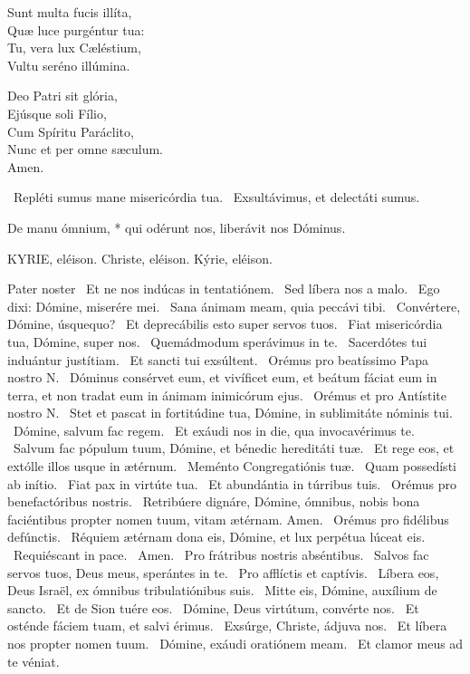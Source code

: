 Sunt multa fucis illíta,\\
Quæ luce purgéntur tua:\\
Tu, vera lux Cæléstium,\\
Vultu seréno illúmina.

Deo Patri sit glória,\\
Ejúsque soli Fílio,\\
Cum Spíritu Paráclito,\\
Nunc et per omne sæculum.\\
Amen.

\V\ Repléti sumus mane misericórdia tua. \R\ Exsultávimus, et delectáti sumus.

 De manu ómnium, * qui odérunt nos, liberávit nos Dóminus.



KYRIE, eléison. Christe, eléison. Kýrie, eléison.

Pater noster  \V\ Et ne nos indúcas in tentatiónem. \R\ Sed líbera nos a malo. \V\ Ego dixi: Dómine, miserére mei. \R\ Sana ánimam meam, quia peccávi tibi. \V\ Convértere, Dómine, úsquequo? \R\ Et deprecábilis esto super servos tuos. \V\ Fiat misericórdia tua, Dómine, super nos. \R\ Quemádmodum sperávimus in te. \V\ Sacerdótes tui induántur justítiam. \R\ Et sancti tui exsúltent. \V\ Orémus pro beatíssimo Papa nostro N. \R\ Dóminus consérvet eum, et vivíficet eum, et beátum fáciat eum in terra, et non tradat eum in ánimam inimicórum ejus. \V\ Orémus et pro Antístite nostro N. \R\ Stet et pascat in fortitúdine tua, Dómine, in sublimitáte nóminis tui. \V\ Dómine, salvum fac regem. \R\ Et exáudi nos in die, qua invocavérimus te. \V\ Salvum fac pópulum tuum, Dómine, et bénedic hereditáti tuæ. \R\ Et rege eos, et extólle illos usque in ætérnum. \V\ Meménto Congregatiónis tuæ. \R\ Quam possedísti ab inítio. \V\ Fiat pax in virtúte tua. \R\ Et abundántia in túrribus tuis. \V\ Orémus pro benefactóribus nostris. \R\ Retribúere dignáre, Dómine, ómnibus, nobis bona faciéntibus propter nomen tuum, vitam ætérnam. Amen. \V\ Orémus pro fidélibus defúnctis. \R\ Réquiem ætérnam dona eis, Dómine, et lux perpétua lúceat eis. \V\ Requiéscant in pace. \R\ Amen. \V\ Pro frátribus nostris abséntibus. \R\ Salvos fac servos tuos, Deus meus, sperántes in te. \V\ Pro afflíctis et captívis. \R\ Líbera eos, Deus Israël, ex ómnibus tribulatiónibus suis. \V\ Mitte eis, Dómine, auxílium de sancto. \R\ Et de Sion tuére eos. \V\ Dómine, Deus virtútum, convérte nos. \R\ Et osténde fáciem tuam, et salvi érimus. \V\ Exsúrge, Christe, ádjuva nos. \R\ Et líbera nos propter nomen tuum. \V\ Dómine, exáudi oratiónem meam. \R\ Et clamor meus ad te véniat.

